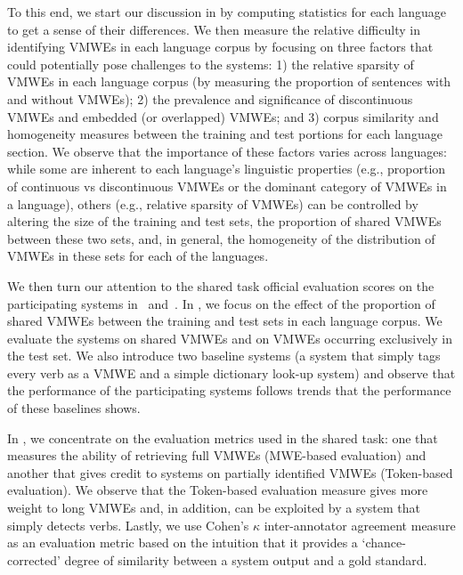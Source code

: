 \documentclass[output=paper
,modfonts
,nonflat,draftmode]{langsci/langscibook}
\begin{document}
To this end, we start our discussion in  by computing statistics for each language to get a sense of their differences. We then measure the relative difficulty in identifying VMWEs in each language corpus by focusing on three factors that could potentially pose challenges to the systems: 1) the relative sparsity of VMWEs in each language corpus (by measuring the proportion of sentences with and without VMWEs); 2) the prevalence and significance of discontinuous VMWEs and embedded (or overlapped) VMWEs; and 3) corpus similarity and homogeneity measures between the training and test portions for each language section. We observe that the importance of these factors varies across languages: while some are inherent to each language's linguistic properties (e.g., proportion of continuous vs discontinuous VMWEs or the dominant category of VMWEs in a language), others (e.g., relative sparsity of VMWEs) can be controlled by altering the size of the training and test sets, the proportion of shared VMWEs between these two sets, and, in general, the homogeneity of the distribution of VMWEs in these sets for each of the languages.  

We then turn our attention to the shared task official evaluation scores on the participating systems in ~and~. In , we focus on the effect of the proportion of shared VMWEs between the training and test sets in each language corpus. We evaluate the systems on shared VMWEs and on VMWEs occurring exclusively in the test set. We also introduce two baseline systems (a system that simply tags every verb as a VMWE and a simple dictionary look-up system) and observe that the performance of the participating systems follows trends that the performance of these baselines shows. 

In , we concentrate on the evaluation metrics used in the shared task: one that measures the ability of retrieving full VMWEs (MWE-based evaluation) and another that gives credit to systems on partially identified VMWEs (Token-based evaluation). We observe that the Token-based evaluation measure gives more weight to long VMWEs and, in addition, can be exploited by a system that simply detects verbs. Lastly, we use Cohen's $\kappa$ inter-annotator agreement measure as an evaluation metric based on the intuition that it provides a `chance-corrected' degree of similarity between a system output and a gold standard. 
\end{document}

